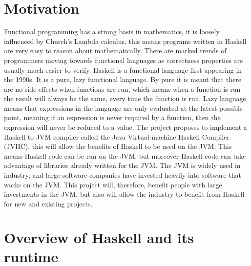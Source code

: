 \documentclass[float=false, crop=false]{standalone}
\begin{document}
\section{Motivation}

Functional programming has a strong basis in mathematics, it is
loosely influenced by Church's Lambda calculus, this means
programs written in Haskell are very easy to reason about mathematically.
There are marked trends of programmers moving towards functional 
languages as correctness properties are usually much easier to verify.
Haskell is a functional language first appearing in the 1990s.
It is a pure, lazy functional language. By pure it is meant 
that there are no side effects when functions are run, which means
when a function is run the result will always be the same, every time 
the function is run. Lazy language means that
expressions in the language are only evaluated at the latest possible
point, meaning if an expression is never required by a function, then 
the expression will never be reduced to a value.
The project proposes to implement a Haskell to JVM compiler called 
the Java Virtual-machine Haskell Compiler (JVHC), 
this will allow the benefits of Haskell to be used on the JVM. This means
Haskell code can be run on the JVM, but moreover Haskell code
can take advantage of libraries already written for the JVM. 
The JVM is widely used in industry, and large software companies
have invested heavily into software that works on the JVM. This project
will, therefore, benefit people with large investments in the JVM, 
but also will allow the industry to benefit from Haskell for new and
existing projects.



\section{Overview of Haskell and its runtime}
\end{document}

